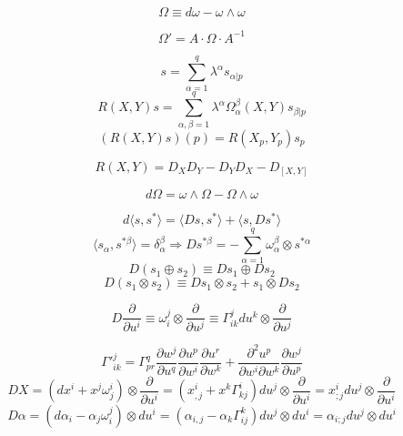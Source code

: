 \begin{newdef}
\[\Omega \equiv d\omega - \omega \wedge \omega\]
\end{newdef}

\begin{newprop}
\[\Omega' = A \cdot \Omega \cdot A^{-1}\]
\end{newprop}

\begin{newdef}
\[s = \sum_{\alpha=1}^{q} \lambda^{\alpha} s_{\alpha|p}\]
\[R(X,Y)s = \sum_{\alpha,\beta=1}^{q} \lambda^{\alpha} \Omega^{\beta}_{\alpha}(X,Y)s_{\beta|p}\]
\[(R(X,Y)s)(p) = R(X_p,Y_p)s_p\]
\end{newdef}

\begin{newprop}
\[R(X,Y) = D_X D_Y - D_Y D_X -D_{[X,Y]}\]
\end{newprop}

\begin{newthem}
\[d\Omega = \omega \wedge \Omega - \Omega \wedge \omega\]
\end{newthem}

\begin{newdef}
\[d\langle s,s^* \rangle = \langle Ds,s^* \rangle + \langle s,Ds^* \rangle\]
\[\langle s_{\alpha},s^{*\beta} \rangle  = \delta^{\beta}_{\alpha}  \Rightarrow Ds^{*\beta} = -\sum_{\alpha=1}^{q} \omega^{\beta}_{\alpha} \otimes s^{*\alpha}\]
\[D(s_1 \oplus s_2) \equiv Ds_1 \oplus Ds_2\]
\[D(s_1 \otimes s_2) \equiv Ds_1 \otimes s_2 + s_1 \otimes Ds_2\]
\end{newdef}

\begin{newdef}
\[D\frac{\partial}{\partial u^i} \equiv \omega^j_i \otimes \frac{\partial}{\partial u^j} \equiv \Gamma^{j}_{ik} du^k \otimes \frac{\partial}{\partial u^j}\]
\end{newdef}

\begin{newprop}
\[\Gamma'^{j}_{ik} = \Gamma^{q}_{pr} \frac{\partial w^j}{\partial u^q} \frac{\partial u^p}{\partial w^i} \frac{\partial u^r}{\partial w^k} + \frac{\partial^2 u^p}{\partial w^i \partial w^k} \frac{\partial w^j}{\partial u^p}\]
\[DX = (dx^i + x^j \omega^i_j)\otimes \frac{\partial}{\partial u^i} = (x^i_{,j} + x^k \Gamma^{i}_{kj}) du^j \otimes \frac{\partial}{\partial u^i} = x^i_{;j}du^j \otimes \frac{\partial}{\partial u^i} \]
\[D \alpha = (d\alpha_i - \alpha_j \omega^j_i)\otimes du^i = (\alpha_{i,j} -\alpha_k \Gamma^k_{ij})du^j \otimes du^i = \alpha_{i;j} du^j \otimes du^i \]
\end{newprop}

